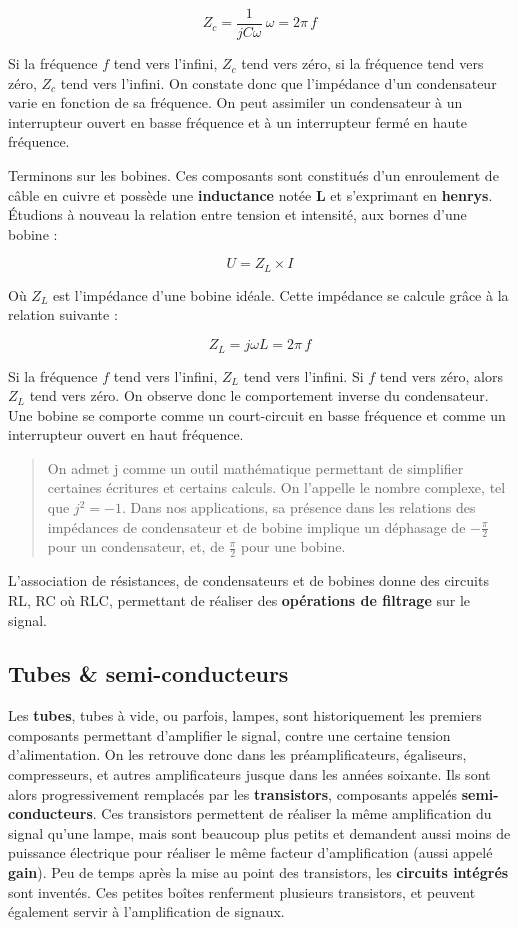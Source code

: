 \documentclass[
]{book}
\begin{document}
\[ Z_c = \frac{1}{jC\omega} \> \omega = 2 \pi \, f\]

Si la fréquence \(f\) tend vers l'infini, \(Z_c\) tend vers zéro, si la fréquence tend vers zéro, \(Z_c\) tend vers l'infini. On constate donc que l'impédance d'un condensateur varie en fonction de sa fréquence. On peut assimiler un condensateur à un interrupteur ouvert en basse fréquence et à un interrupteur fermé en haute fréquence.

Terminons sur les bobines. Ces composants sont constitués d'un enroulement de câble en cuivre et possède une \textbf{inductance} notée \textbf{L} et s'exprimant en \textbf{henrys}. Étudions à nouveau la relation entre tension et intensité, aux bornes d'une bobine :

\[ U = Z_L \times I \]

Où \(Z_L\) est l'impédance d'une bobine idéale. Cette impédance se calcule grâce à la relation suivante :

\[ Z_L = j\omega L = 2 \pi \, f \]

Si la fréquence \(f\) tend vers l'infini, \(Z_L\) tend vers l'infini. Si \(f\) tend vers zéro, alors \(Z_L\) tend vers zéro. On observe donc le comportement inverse du condensateur. Une bobine se comporte comme un court-circuit en basse fréquence et comme un interrupteur ouvert en haut fréquence.

\begin{quote}
On admet j comme un outil mathématique permettant de simplifier certaines écritures et certains calculs. On l'appelle le nombre complexe, tel que \(j^2 = -1\). Dans nos applications, sa présence dans les relations des impédances de condensateur et de bobine implique un déphasage de \(-\frac{\pi}{2}\) pour un condensateur, et, de \(\frac{\pi}{2}\) pour une bobine.
\end{quote}

L'association de résistances, de condensateurs et de bobines donne des circuits RL, RC où RLC, permettant de réaliser des \textbf{opérations de filtrage} sur le signal.

\hypertarget{tubes-semi-conducteurs}{%
\subsection{Tubes \& semi-conducteurs}\label{tubes-semi-conducteurs}}

Les \textbf{tubes}, tubes à vide, ou parfois, lampes, sont historiquement les premiers composants permettant d'amplifier le signal, contre une certaine tension d'alimentation. On les retrouve donc dans les préamplificateurs, égaliseurs, compresseurs, et autres amplificateurs jusque dans les années soixante. Ils sont alors progressivement remplacés par les \textbf{transistors}, composants appelés \textbf{semi-conducteurs}. Ces transistors permettent de réaliser la même amplification du signal qu'une lampe, mais sont beaucoup plus petits et demandent aussi moins de puissance électrique pour réaliser le même facteur d'amplification (aussi appelé \textbf{gain}). Peu de temps après la mise au point des transistors, les \textbf{circuits intégrés} sont inventés. Ces petites boîtes renferment plusieurs transistors, et peuvent également servir à l'amplification de signaux.
\end{document}
